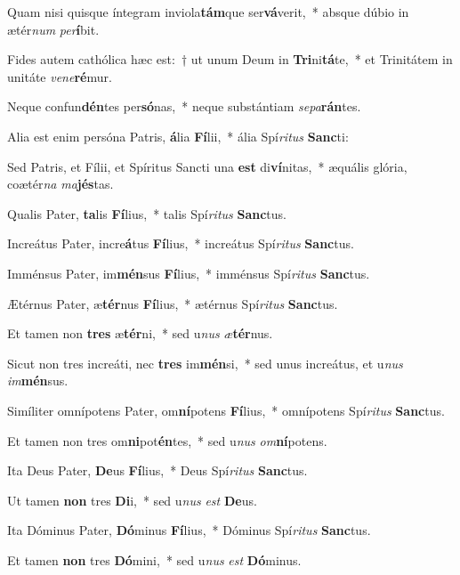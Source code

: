 \item Quam nisi quisque íntegram inviola\textbf{tám}que ser\textbf{vá}verit,~* absque dúbio in ætér\textit{num} \textit{per}\textbf{í}bit.
\item Fides autem cathólica hæc est:~† ut unum Deum in \textbf{Tri}ni\textbf{tá}te,~* et Trinitátem in unitáte \textit{ve}\textit{ne}\textbf{ré}mur.
\item Neque confun\textbf{dén}tes per\textbf{só}nas,~* neque substántiam \textit{se}\textit{pa}\textbf{rán}tes.
\item Alia est enim persóna Patris, \textbf{á}lia \textbf{Fí}lii,~* ália Spí\textit{ri}\textit{tus} \textbf{Sanc}ti:
\item Sed Patris, et Fílii, et Spíritus Sancti una \textbf{est} di\textbf{ví}nitas,~* æquális glória, coætér\textit{na} \textit{ma}\textbf{jés}tas.
\item Qualis Pater, \textbf{ta}lis \textbf{Fí}lius,~* talis Spí\textit{ri}\textit{tus} \textbf{Sanc}tus.
\item Increátus Pater, incre\textbf{á}tus \textbf{Fí}lius,~* increátus Spí\textit{ri}\textit{tus} \textbf{Sanc}tus.
\item Imménsus Pater, im\textbf{mén}sus \textbf{Fí}lius,~* imménsus Spí\textit{ri}\textit{tus} \textbf{Sanc}tus.
\item Ætérnus Pater, æ\textbf{tér}nus \textbf{Fí}lius,~* ætérnus Spí\textit{ri}\textit{tus} \textbf{Sanc}tus.
\item Et tamen non \textbf{tres} æ\textbf{tér}ni,~* sed u\textit{nus} \textit{æ}\textbf{tér}nus.
\item Sicut non tres increáti, nec \textbf{tres} im\textbf{mén}si,~* sed unus increátus, et u\textit{nus} \textit{im}\textbf{mén}sus.
\item Simíliter omnípotens Pater, om\textbf{ní}potens \textbf{Fí}lius,~* omnípotens Spí\textit{ri}\textit{tus} \textbf{Sanc}tus.
\item Et tamen non tres om\textbf{ni}pot\textbf{én}tes,~* sed u\textit{nus} \textit{om}\textbf{ní}potens.
\item Ita Deus Pater, \textbf{De}us \textbf{Fí}lius,~* Deus Spí\textit{ri}\textit{tus} \textbf{Sanc}tus.
\item Ut tamen \textbf{non} tres \textbf{Di}i,~* sed u\textit{nus} \textit{est} \textbf{De}us.
\item Ita Dóminus Pater, \textbf{Dó}minus \textbf{Fí}lius,~* Dóminus Spí\textit{ri}\textit{tus} \textbf{Sanc}tus.
\item Et tamen \textbf{non} tres \textbf{Dó}mini,~* sed u\textit{nus} \textit{est} \textbf{Dó}minus.

